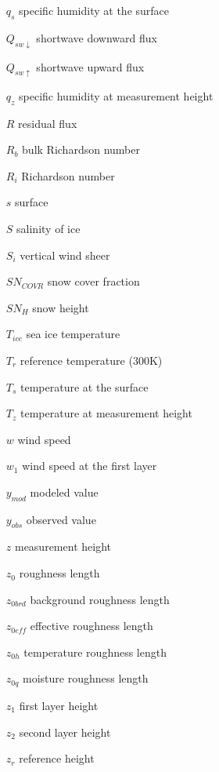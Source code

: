\begin{enumerate}
    \item[$q_{s}$] specific humidity at the surface
    \item[$Q_{sw \downarrow}$] shortwave downward flux
    \item[$Q_{sw \uparrow}$] shortwave upward flux
    \item[$q_{z}$] specific humidity at measurement height
    \item[$R$] residual flux
    \item[$R_{b}$] bulk Richardson number
    \item[$R_{i}$] Richardson number
    \item[$s$] surface
    \item[$S$] salinity of ice
    \item[$S_{i}$] vertical wind sheer
    \item[$SN_{COVR}$] snow cover fraction
    \item[$SN_{H}$] snow height
    \item[$T_{ice}$] sea ice temperature
    \item[$T_{r}$] reference temperature (300K)
    \item[$T_{s}$] temperature at the surface
    \item[$T_{z}$] temperature at measurement height
    \item[$w$] wind speed
    \item[$w_{1}$] wind speed at the first layer
    \item[$y_{mod}$] modeled value
    \item[$y_{obs}$] observed value
    \item[$z$] measurement height
    \item[$z_{0}$] roughness length
    \item[$z_{0brd}$] background roughness length
    \item[$z_{0eff}$] effective roughness length
    \item[$z_{0h}$] temperature roughness length
    \item[$z_{0q}$] moisture roughness length
    \item[$z_{1}$] first layer height
    \item[$z_{2}$] second layer height
    \item[$z_{r}$] reference height
\end{enumerate}
